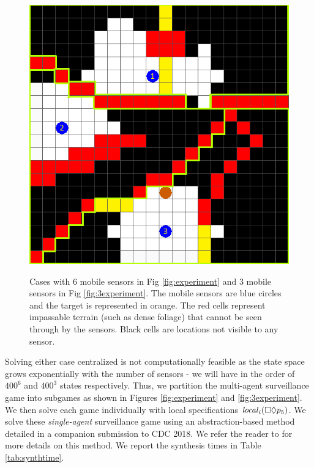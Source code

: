 \begin{figure}
{\includegraphics[scale=0.18]{figs/SGR-grid-vis-part_3.png}
\hspace{.3cm}}

\caption{Cases with 6 mobile sensors in Fig \ref{fig:experiment} and 3 mobile sensors in Fig \ref{fig:3experiment}. The mobile sensors are blue circles and the target is represented in orange. The red cells represent impassable terrain (such as dense foliage) that cannot be seen through by the sensors. Black cells are locations not visible to any sensor.}\label{fig:bigexp}\vspace{-0.5cm}
\end{figure} 

Solving either case centralized is not computationally feasible as the state space grows exponentially with the number of sensors - we will have in the order of $400^6$ and $400^3$ states respectively. Thus, we partition the multi-agent surveillance game into subgames as shown in Figures \ref{fig:experiment} and \ref{fig:3experiment}. We then solve each game individually with local specifications $\mathit{local}_i(\square \lozenge p_5)$. We solve these \emph{single-agent} surveillance game using an abstraction-based method detailed in a companion submission to CDC 2018. We refer the reader to \cite{arxiv} for more details on this method. We report the synthesis times in Table \ref{tab:synthtime}.

